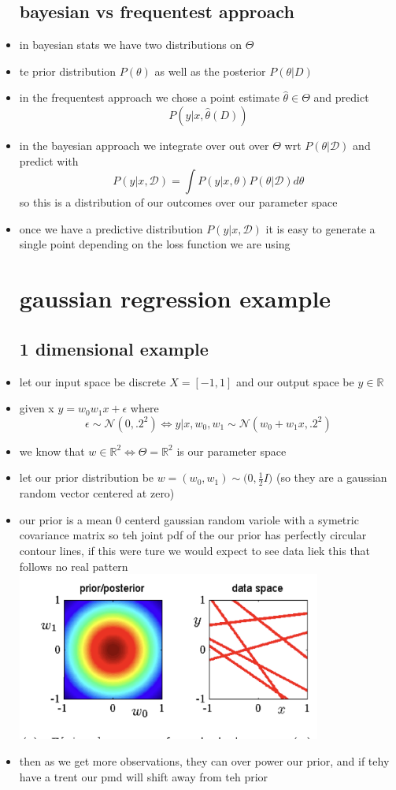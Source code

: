 \documentclass{article}
\begin{document}
\begin{itemize}
\subsection*{bayesian vs frequentest approach}
\item in bayesian stats we have two distributions on $\Theta$
\item te prior distribution $P(\theta)$ as well as the posterior $P(\theta|D)$
\item in the frequentest approach we chose a point estimate $\hat{\theta}\in \Theta$ and predict $$P(y|x, \hat{\theta}(D))$$
\item in the bayesian approach we integrate over out over $\Theta$ wrt $P(\theta|\mathcal{D})$ and predict with $$P(y|x,\mathcal{D})=\int P(y|x,\theta)P(\theta|\mathcal{D})d\theta$$  so this is a distribution of our outcomes over our parameter space 
\item once we have a predictive distribution $P(y|x,\mathcal{D})$ it is easy to generate a single point depending on the loss function we are using 
\section*{gaussian regression example}
\subsection*{1 dimensional example}
\item let our input space be discrete $X=[-1,1]$ and our output space be $y\in \mathbb{R}$
\item given x $y=w_{0}w_{1}x+\epsilon$ where $$\epsilon\sim\mathcal{N}(0,.2^{2}) \iff y|x,w_0,w_1 \sim \mathcal{N}(w_0+w_1x,.2^{2}) $$
\item we know that $w\in \mathbb{R}^{2}\iff \Theta=\mathbb{R}^2$ is our parameter space
\item let our prior distribution be $w=(w_0,w_1)\sim \mathcal(0, \frac{1}{2}I)$ (so they are a gaussian random vector centered at zero)
\item our prior is a mean 0 centerd gaussian random variole with a symetric covariance matrix so teh joint pdf of the our prior has perfectly circular contour lines, if this were ture we would expect to see data liek this that follows no real pattern \includegraphics*[width=10cm]{images/Screenshot 2023-05-14 at 3.26.41 AM.png}
\item then as we get more observations, they can over power our prior, and if tehy have a trent our pmd will shift away from teh prior

\end{itemize}
\end{document}
